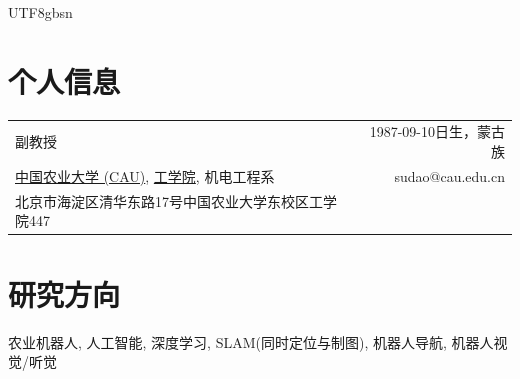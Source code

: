 \documentclass[margin,line]{res}
\begin{document}
\begin{CJK*}{UTF8}{gbsn}


\begin{resume}



\section{\sc 个人信息}
\vspace{.05in}
\begin{tabularx}{\textwidth}{X r}
副教授 & 1987-09-10日生，蒙古族\\
\href{http://en.cau.edu.cn/}{中国农业大学 (CAU)}, \href{http://coe.cau.edu.cn/}{工学院}, 机电工程系     &  sudao@cau.edu.cn \\            
北京市海淀区清华东路17号中国农业大学东校区工学院447 & \\         
\end{tabularx}



\section{\sc 研究方向}
农业机器人, 人工智能, 深度学习, SLAM(同时定位与制图), 机器人导航, 机器人视觉/听觉



\end{resume}
\end{CJK*}
\end{document}

